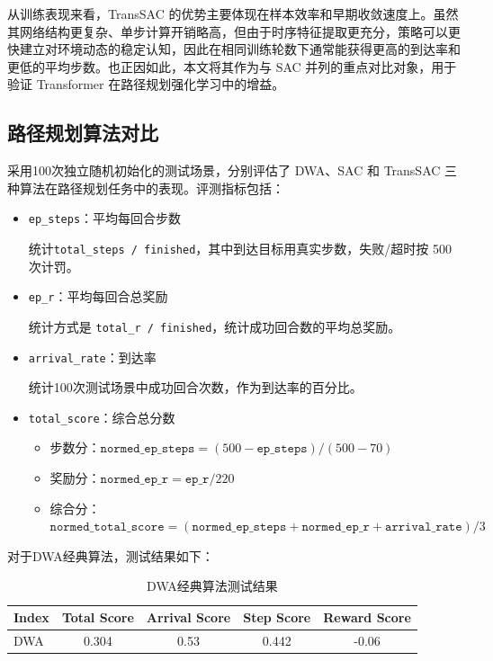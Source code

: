 从训练表现来看，TransSAC 的优势主要体现在样本效率和早期收敛速度上。虽然其网络结构更复杂、单步计算开销略高，但由于时序特征提取更充分，策略可以更快建立对环境动态的稳定认知，因此在相同训练轮数下通常能获得更高的到达率和更低的平均步数。也正因如此，本文将其作为与 SAC 并列的重点对比对象，用于验证 Transformer 在路径规划强化学习中的增益。

\subsection{路径规划算法对比}
采用100次独立随机初始化的测试场景，分别评估了 DWA、SAC 和 TransSAC 三种算法在路径规划任务中的表现。评测指标包括：
\begin{itemize}
    \item \texttt{ep\_steps}：平均每回合步数

    统计\texttt{total\_steps / finished}，其中到达目标用真实步数，失败/超时按 500 次计罚。

    \item \texttt{ep\_r}：平均每回合总奖励

    统计方式是 \texttt{total\_r / finished}，统计成功回合数的平均总奖励。

    \item \texttt{arrival\_rate}：到达率

    统计100次测试场景中成功回合次数，作为到达率的百分比。

    \item \texttt{total\_score}：综合总分数

    \begin{itemize}
        \item 步数分：$\texttt{normed\_ep\_steps} = (500-\texttt{ep\_steps})/(500-70)$
        \item 奖励分：$\texttt{normed\_ep\_r} = \texttt{ep\_r}/220$
        \item 综合分：$\texttt{normed\_total\_score} = (\texttt{normed\_ep\_steps} + \texttt{normed\_ep\_r} + \texttt{arrival\_rate})/3$
    \end{itemize}
\end{itemize}

对于DWA经典算法，测试结果如下：
\begin{table}[H]
    \centering
    \caption{DWA经典算法测试结果}
    \label{tab:dwa_eval_result}
    \begin{tabular}{lcccc}
        \toprule
        \textbf{Index} & \textbf{Total Score} & \textbf{Arrival Score} & \textbf{Step Score} & \textbf{Reward Score} \\
        \midrule
        DWA & 0.304 & 0.53 & 0.442 & -0.06 \\
        \bottomrule
    \end{tabular}
\end{table}

